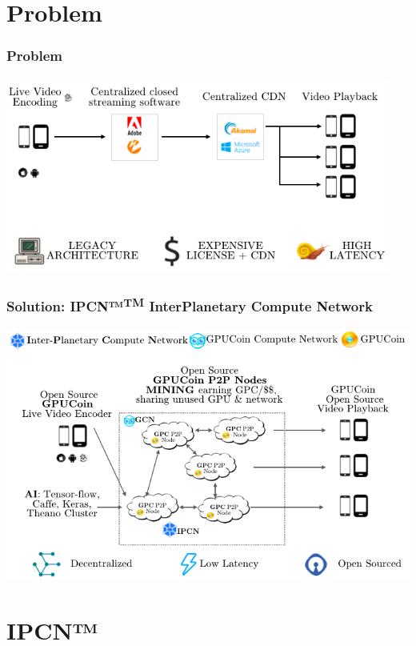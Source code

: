 \documentclass[10pt,handout]{beamer}
\begin{document}
\section{Problem}
\begin{frame}[t]\frametitle{Problem}
 \includegraphics[width=0.95\textwidth]{static/problem-architecture-trans-cmrfont}

\end{frame}
\begin{frame}[t]\frametitle{Solution: IPCN™\textsuperscript{TM} InterPlanetary Compute Network}
\includegraphics[width=.95\textwidth]{static/GPUCoin-solution-trans-ai-cmrfont}

\end{frame}
\section{IPCN™}

\end{document}
